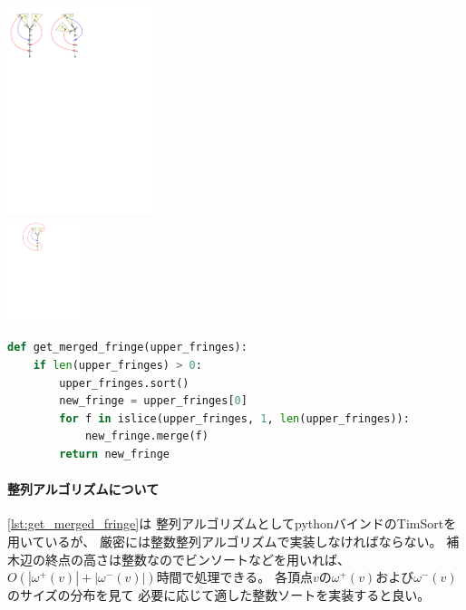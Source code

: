 \begin{paracol}{2}
\switchcolumn
\vspace{1.5\intextsep}
\centering
\includegraphics[width=0.32\textwidth]{figures/get_merged_fringe.pdf}\\
\includegraphics[width=0.16\textwidth]{figures/get_merged_fringe2.pdf}
\end{paracol}



\begin{lstlisting}[language=Python, caption=get\_merged\_fringe,escapechar=@,
                   label=lst:get_merged_fringe]
def get_merged_fringe(upper_fringes):
    if len(upper_fringes) > 0:
        upper_fringes.sort()
        new_fringe = upper_fringes[0]
        for f in islice(upper_fringes, 1, len(upper_fringes)):
            new_fringe.merge(f)
        return new_fringe
\end{lstlisting}

\paragraph{整列アルゴリズムについて}
\lstrefname\ref{lst:get_merged_fringe}は
整列アルゴリズムとしてpythonバインドのTimSortを用いているが、
厳密には整数整列アルゴリズムで実装しなければならない。
補木辺の終点の高さは整数なのでビンソートなどを用いれば、
$O(|\omega^+(v)|+|\omega^-(v)|)$時間で処理できる。
各頂点$v$の$\omega^+(v)$および$\omega^-(v)$のサイズの分布を見て
必要に応じて適した整数ソートを実装すると良い。





